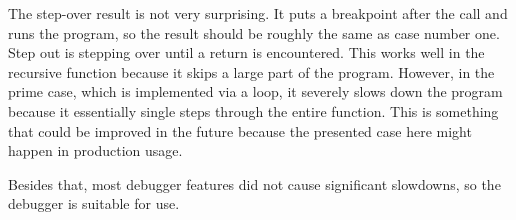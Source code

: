 The step-over result is not very surprising. It puts a breakpoint after the
call and runs the program, so the result should be roughly the same as case
number one. Step out is stepping over until a return is encountered. This works
well in the recursive function because it skips a large part of the program.
However, in the prime case, which is implemented via a loop, it severely slows
down the program because it essentially single steps through the entire
function. This is something that could be improved in the future because the
presented case here might happen in production usage.

Besides that, most debugger features did not cause significant slowdowns, so
the debugger is suitable for use.
